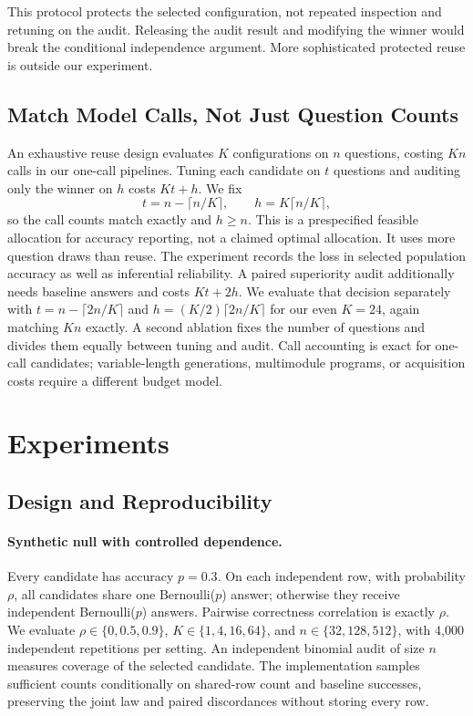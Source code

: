 \documentclass{article}
\begin{document}
This protocol protects the selected configuration, not repeated inspection and retuning on the audit. Releasing the audit result and modifying the winner would break the conditional independence argument. More sophisticated protected reuse is outside our experiment.

\subsection{Match Model Calls, Not Just Question Counts}
An exhaustive reuse design evaluates $K$ configurations on $n$ questions, costing $Kn$ calls in our one-call pipelines. Tuning each candidate on $t$ questions and auditing only the winner on $h$ costs $Kt+h$. We fix
\begin{equation}
 t=n-\lceil n/K\rceil,\qquad
 h=K\lceil n/K\rceil,
 \label{eq:budget}
\end{equation}
so the call counts match exactly and $h\geq n$. This is a prespecified feasible allocation for accuracy reporting, not a claimed optimal allocation. It uses more question draws than reuse. The experiment records the loss in selected population accuracy as well as inferential reliability. A paired superiority audit additionally needs baseline answers and costs $Kt+2h$. We evaluate that decision separately with $t=n-\lceil2n/K\rceil$ and $h=(K/2)\lceil2n/K\rceil$ for our even $K=24$, again matching $Kn$ exactly. A second ablation fixes the number of questions and divides them equally between tuning and audit. Call accounting is exact for one-call candidates; variable-length generations, multimodule programs, or acquisition costs require a different budget model.

\section{Experiments}
\subsection{Design and Reproducibility}
\paragraph{Synthetic null with controlled dependence.}
Every candidate has accuracy $p=0.3$. On each independent row, with probability $\rho$, all candidates share one Bernoulli($p$) answer; otherwise they receive independent Bernoulli($p$) answers. Pairwise correctness correlation is exactly $\rho$. We evaluate $\rho\in\{0,0.5,0.9\}$, $K\in\{1,4,16,64\}$, and $n\in\{32,128,512\}$, with 4,000 independent repetitions per setting. An independent binomial audit of size $n$ measures coverage of the selected candidate. The implementation samples sufficient counts conditionally on shared-row count and baseline successes, preserving the joint law and paired discordances without storing every row.
\end{document}
